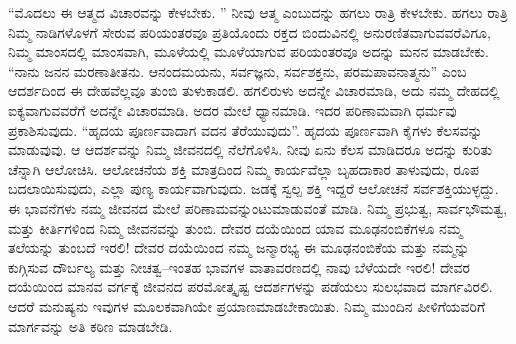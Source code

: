 “ಮೊದಲು ಈ ಆತ್ಮದ ವಿಚಾರವನ್ನು ಕೇಳಬೇಕು. ” ನೀವು ಆತ್ಮ ಎಂಬುದನ್ನು ಹಗಲು ರಾತ್ರಿ ಕೇಳಬೇಕು. ಹಗಲು ರಾತ್ರಿ ನಿಮ್ಮ ನಾಡಿಗಳೊಳಗೆ ಸೇರುವ ಪರಿಯಂತರವೂ ಪ್ರತಿಯೊಂದು ರಕ್ತದ ಬಿಂದುವಿನಲ್ಲಿ ಅನುರಣಿತವಾಗುವವರೆವಿಗೂ, ನಿಮ್ಮ ಮಾಂಸದಲ್ಲಿ ಮಾಂಸವಾಗಿ, ಮೂಳೆಯಲ್ಲಿ ಮೂಳೆಯಾಗುವ ಪರಿಯಂತರವೂ ಅದನ್ನು ಮನನ ಮಾಡಬೇಕು. “ನಾನು ಜನನ ಮರಣಾತೀತನು. ಆನಂದಮಯನು, ಸರ್ವಜ್ಞನು, ಸರ್ವಶಕ್ತನು, ಪರಮಪಾವನಾತ್ಮನು” ಎಂಬ ಆದರ್ಶದಿಂದ ಈ ದೇಹವೆಲ್ಲವೂ ತುಂಬಿ ತುಳುಕಾಡಲಿ. ಹಗಲಿರುಳು ಅದನ್ನೇ ವಿಚಾರಮಾಡಿ, ಅದು ನಮ್ಮ ದೇಹದಲ್ಲಿ ಐಕ್ಯವಾಗುವವರೆಗೆ ಅದನ್ನೇ ವಿಚಾರಮಾಡಿ. ಅದರ ಮೇಲೆ ಧ್ಯಾನಮಾಡಿ. ಇದರ ಪರಿಣಾಮವಾಗಿ ಧರ್ಮವು ಪ್ರಕಾಶಿಸುವುದು. “ಹೃದಯ ಪೂರ್ಣವಾದಾಗ ವದನ ತೆರೆಯುವುದು”. ಹೃದಯ ಪೂರ್ಣವಾಗಿ ಕೈಗಳು ಕೆಲಸವನ್ನು ಮಾಡುವುವು. ಆ ಆದರ್ಶವನ್ನು ನಿಮ್ಮ ಜೀವನದಲ್ಲಿ ನೆಲೆಗೊಳಿಸಿ. ನೀವು ಏನು ಕೆಲಸ ಮಾಡಿದರೂ ಅದನ್ನು ಕುರಿತು ಚೆನ್ನಾಗಿ ಆಲೋಚಿಸಿ. ಆಲೋಚನೆಯ ಶಕ್ತಿ ಮಾತ್ರದಿಂದ ನಿಮ್ಮ ಕಾರ್ಯವೆಲ್ಲಾ ಬೃಹದಾಕಾರ ತಾಳುವುದು, ರೂಪ ಬದಲಾಯಿಸುವುದು, ಎಲ್ಲಾ ಪುಣ್ಯ ಕಾರ್ಯವಾಗುವುದು. ಜಡಕ್ಕೆ ಸ್ವಲ್ಪ ಶಕ್ತಿ ಇದ್ದರೆ ಆಲೋಚನೆ ಸರ್ವಶಕ್ತಿಯುಳ್ಳದ್ದು. ಈ ಭಾವನೆಗಳು ನಮ್ಮ ಜೀವನದ ಮೇಲೆ ಪರಿಣಾಮವನ್ನುಂಟುಮಾಡುವಂತೆ ಮಾಡಿ. ನಿಮ್ಮ ಪ್ರಭುತ್ವ, ಸಾರ್ವಭೌಮತ್ವ, ಮತ್ತು ಕೀರ್ತಿಗಳಿಂದ ನಿಮ್ಮ ಜೀವನವನ್ನು ತುಂಬಿ. ದೇವರ ದಯೆಯಿಂದ ಯಾವ ಮೂಢನಂಬಿಕೆಗಳೂ ನಮ್ಮ ತಲೆಯನ್ನು ತುಂಬದೆ ಇರಲಿ! ದೇವರ ದಯೆಯಿಂದ ನಮ್ಮ ಜನ್ಮಾರಭ್ಯ ಈ ಮೂಢನಂಬಿಕೆಯ ಮತ್ತು ನಮ್ಮನ್ನು ಕುಗ್ಗಿಸುವ ದೌರ್ಬಲ್ಯ ಮತ್ತು ನೀಚತ್ವ–ಇಂತಹ ಭಾವಗಳ ವಾತಾವರಣದಲ್ಲಿ ನಾವು ಬೆಳೆಯದೇ ಇರಲಿ! ದೇವರ ದಯೆಯಿಂದ ಮಾನವ ವರ್ಗಕ್ಕೆ ಜೀವನದ ಪರಮೋತ್ಕೃಷ್ಟ ಆದರ್ಶಗಳನ್ನು ಪಡೆಯಲು ಸುಲಭವಾದ ಮಾರ್ಗವಿರಲಿ. ಆದರೆ ಮನುಷ್ಯನು ಇವುಗಳ ಮೂಲಕವಾಗಿಯೇ ಪ್ರಯಾಣಮಾಡಬೇಕಾಯಿತು. ನಿಮ್ಮ ಮುಂದಿನ ಪೀಳಿಗೆಯವರಿಗೆ ಮಾರ್ಗವನ್ನು ಅತಿ ಕಠಿಣ ಮಾಡಬೇಡಿ. 

\newpage

